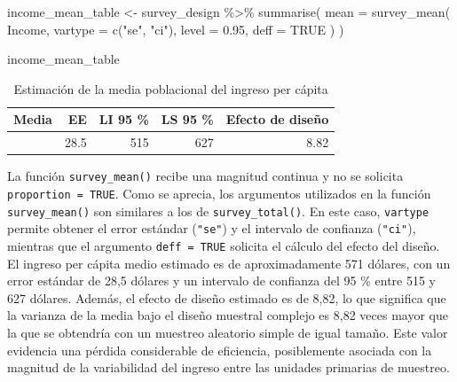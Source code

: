 \documentclass[
  spanish,
  11pt,
  letterpaper,
  oneside,
  open=any]{scrbook}
\newenvironment{Shaded}{\begin{snugshade}}{\end{snugshade}}
\newcommand{\AttributeTok}[1]{\textcolor[rgb]{0.40,0.45,0.13}{#1}}
\newcommand{\ConstantTok}[1]{\textcolor[rgb]{0.56,0.35,0.01}{#1}}
\newcommand{\FloatTok}[1]{\textcolor[rgb]{0.68,0.00,0.00}{#1}}
\newcommand{\FunctionTok}[1]{\textcolor[rgb]{0.28,0.35,0.67}{#1}}
\newcommand{\NormalTok}[1]{\textcolor[rgb]{0.00,0.23,0.31}{#1}}
\newcommand{\OtherTok}[1]{\textcolor[rgb]{0.00,0.23,0.31}{#1}}
\newcommand{\SpecialCharTok}[1]{\textcolor[rgb]{0.37,0.37,0.37}{#1}}
\newcommand{\StringTok}[1]{\textcolor[rgb]{0.13,0.47,0.30}{#1}}
\begin{document}
\begin{Shaded}
\begin{Highlighting}[]
\NormalTok{income\_mean\_table }\OtherTok{\textless{}{-}}\NormalTok{ survey\_design }\SpecialCharTok{\%\textgreater{}\%}
  \FunctionTok{summarise}\NormalTok{(}
    \AttributeTok{mean =} \FunctionTok{survey\_mean}\NormalTok{(}
\NormalTok{      Income,}
      \AttributeTok{vartype =} \FunctionTok{c}\NormalTok{(}\StringTok{"se"}\NormalTok{, }\StringTok{"ci"}\NormalTok{),}
      \AttributeTok{level =} \FloatTok{0.95}\NormalTok{,}
      \AttributeTok{deff =} \ConstantTok{TRUE}
\NormalTok{    )}
\NormalTok{  )}

\NormalTok{income\_mean\_table}
\end{Highlighting}
\end{Shaded}

{

\begin{longtable}[]{@{}rrrrr@{}}

\caption{\label{tbl-media-ingreso}Estimación de la media poblacional del
ingreso per cápita}

\tabularnewline

\toprule\noalign{}
Media & EE & LI 95 \% & LS 95 \% & Efecto de diseño \\
\midrule\noalign{}
\endhead
\bottomrule\noalign{}
\endlastfoot
571 & 28.5 & 515 & 627 & 8.82 \\

\end{longtable}

}

La función \texttt{survey\_mean()} recibe una magnitud continua y no se
solicita \texttt{proportion\ =\ TRUE}. Como se aprecia, los argumentos
utilizados en la función \texttt{survey\_mean()} son similares a los de
\texttt{survey\_total()}. En este caso, \texttt{vartype} permite obtener
el error estándar (\texttt{"se"}) y el intervalo de confianza
(\texttt{"ci"}), mientras que el argumento \texttt{deff\ =\ TRUE}
solicita el cálculo del efecto del diseño. El ingreso per cápita medio
estimado es de aproximadamente 571 dólares, con un error estándar de
28,5 dólares y un intervalo de confianza del 95 \% entre 515 y 627
dólares. Además, el efecto de diseño estimado es de 8,82, lo que
significa que la varianza de la media bajo el diseño muestral complejo
es 8,82 veces mayor que la que se obtendría con un muestreo aleatorio
simple de igual tamaño. Este valor evidencia una pérdida considerable de
eficiencia, posiblemente asociada con la magnitud de la variabilidad del
ingreso entre las unidades primarias de muestreo.
\end{document}

